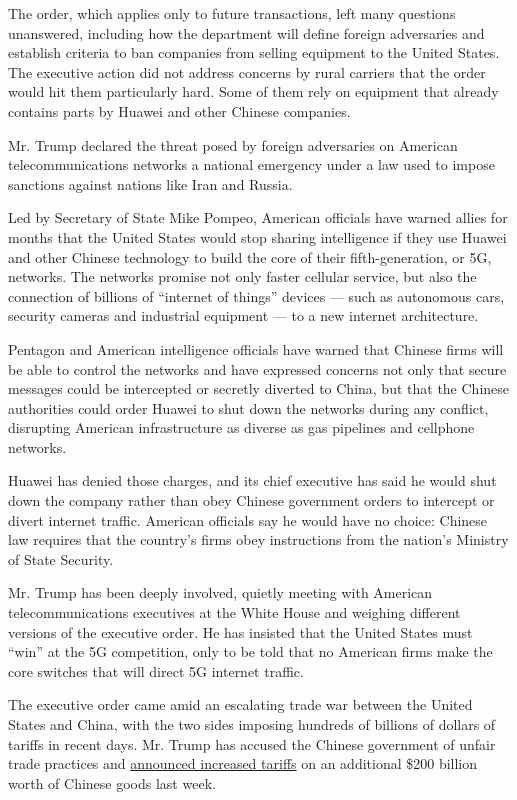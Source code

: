 The order, which applies only to future transactions, left many
questions unanswered, including how the department will define foreign
adversaries and establish criteria to ban companies from selling
equipment to the United States. The executive action did not address
concerns by rural carriers that the order would hit them particularly
hard. Some of them rely on equipment that already contains parts by
Huawei and other Chinese companies.

Mr. Trump declared the threat posed by foreign adversaries on American
telecommunications networks a national emergency under a law used to
impose sanctions against nations like Iran and Russia.

Led by Secretary of State Mike Pompeo, American officials have warned
allies for months that the United States would stop sharing intelligence
if they use Huawei and other Chinese technology to build the core of
their fifth-generation, or 5G, networks. The networks promise not only
faster cellular service, but also the connection of billions of
``internet of things'' devices --- such as autonomous cars, security
cameras and industrial equipment --- to a new internet architecture.

Pentagon and American intelligence officials have warned that Chinese
firms will be able to control the networks and have expressed concerns
not only that secure messages could be intercepted or secretly diverted
to China, but that the Chinese authorities could order Huawei to shut
down the networks during any conflict, disrupting American
infrastructure as diverse as gas pipelines and cellphone networks.

Huawei has denied those charges, and its chief executive has said he
would shut down the company rather than obey Chinese government orders
to intercept or divert internet traffic. American officials say he would
have no choice: Chinese law requires that the country's firms obey
instructions from the nation's Ministry of State Security.

Mr. Trump has been deeply involved, quietly meeting with American
telecommunications executives at the White House and weighing different
versions of the executive order. He has insisted that the United States
must ``win'' at the 5G competition, only to be told that no American
firms make the core switches that will direct 5G internet traffic.

The executive order came amid an escalating trade war between the United
States and China, with the two sides imposing hundreds of billions of
dollars of tariffs in recent days. Mr. Trump has accused the Chinese
government of unfair trade practices and
\href{https://www.nytimes.com/2019/05/09/us/politics/china-trade-tariffs.html}{announced
increased tariffs} on an additional \$200 billion worth of Chinese goods
last week.

